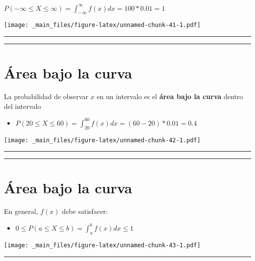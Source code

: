 \documentclass[
]{book}
\providecommand{\tightlist}{%
  \setlength{\itemsep}{0pt}\setlength{\parskip}{0pt}}
\begin{document}
\(P(-\infty\leq X \leq \infty)= \int_{-\infty}^{\infty} f(x) dx = 100*0.01= 1\)

\texttt{[image: \_main\_files/figure-latex/unnamed-chunk-41-1.pdf]}

\begin{center}\rule{0.5\linewidth}{0.5pt}\end{center}

\begin{center}\rule{0.5\linewidth}{0.5pt}\end{center}

\hypertarget{uxe1rea-bajo-la-curva}{%
\section{Área bajo la curva}\label{uxe1rea-bajo-la-curva}}

La probabilidad de observar \(x\) en un intervalo es el \textbf{área bajo la curva} dentro del intervalo

\begin{itemize}
\tightlist
\item
  \(P(20 \leq X \leq 60) = \int_{20}^{60} f(x) dx = (60-20)*0.01=0.4\)
\end{itemize}

\texttt{[image: \_main\_files/figure-latex/unnamed-chunk-42-1.pdf]}

\begin{center}\rule{0.5\linewidth}{0.5pt}\end{center}

\begin{center}\rule{0.5\linewidth}{0.5pt}\end{center}

\hypertarget{uxe1rea-bajo-la-curva-1}{%
\section{Área bajo la curva}\label{uxe1rea-bajo-la-curva-1}}

En general, \(f(x)\) debe satisfacer:

\begin{itemize}
\tightlist
\item
  \(0 \leq P(a \leq X \leq b) = \int_{a}^{b} f(x) dx \leq 1\)
\end{itemize}

\texttt{[image: \_main\_files/figure-latex/unnamed-chunk-43-1.pdf]}

\begin{center}\rule{0.5\linewidth}{0.5pt}\end{center}
\end{document}

